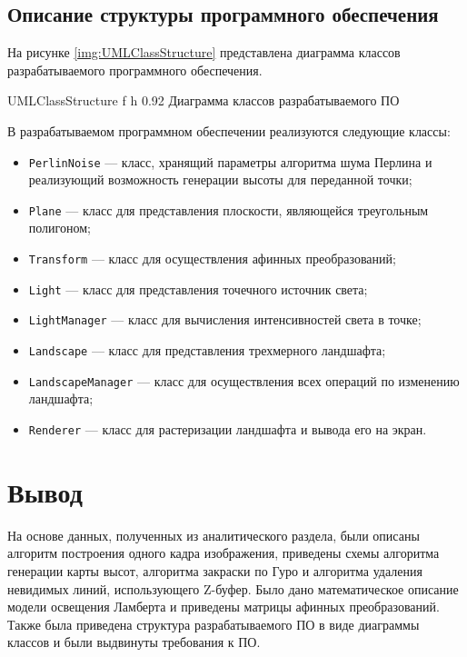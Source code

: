 \subsection{Описание структуры программного обеспечения}

На рисунке \ref{img:UMLClassStructure} представлена диаграмма классов разрабатываемого программного обеспечения.

{UMLClassStructure} %
{f} %
{h} %
{0.92\textwidth} %
{Диаграмма классов разрабатываемого ПО} %

\clearpage

В разрабатываемом программном обеспечении реализуются следующие классы: 

\begin{itemize}[label*=---]
	\item \texttt{PerlinNoise} --- класс, хранящий параметры алгоритма шума Перлина и реализующий возможность генерации высоты для переданной точки;
	\item \texttt{Plane} --- класс для представления плоскости, являющейся треугольным полигоном;
	\item \texttt{Transform} --- класс для осуществления афинных преобразований;
	\item \texttt{Light} --- класс  для представления точечного источник света;
	\item \texttt{LightManager} --- класс для вычисления интенсивностей света в точке;
	\item \texttt{Landscape} --- класс для представления трехмерного ландшафта;
	\item \texttt{LandscapeManager} --- класс для осуществления всех операций по изменению ландшафта;
	\item \texttt{Renderer} --- класс для растеризации ландшафта и вывода его на экран.
\end{itemize}

\section*{Вывод}

На основе данных, полученных из аналитического раздела, были описаны алгоритм построения одного кадра изображения, приведены схемы алгоритма генерации карты высот, алгоритма закраски по Гуро и алгоритма удаления невидимых линий, использующего Z-буфер. 
Было дано математическое описание модели освещения Ламберта и приведены матрицы афинных преобразований. 
Также была приведена структура разрабатываемого ПО в виде диаграммы классов и были выдвинуты требования к ПО.
